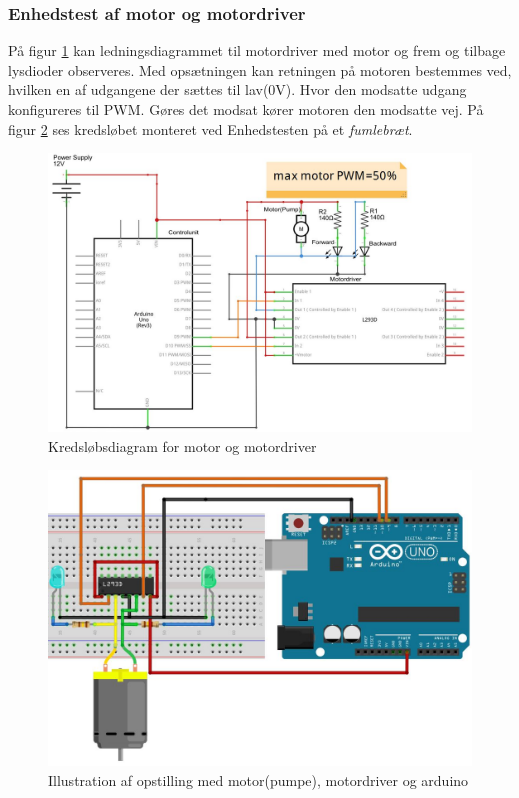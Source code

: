 \subsubsection{Enhedstest af motor og motordriver}
 På figur \ref{fig:motordriverdiagram} kan ledningsdiagrammet til motordriver med motor og frem og tilbage lysdioder observeres. Med opsætningen kan retningen på motoren bestemmes ved, hvilken en af udgangene der sættes til lav(0V). Hvor den modsatte udgang konfigureres til PWM. Gøres det modsat kører motoren den modsatte vej. På figur \ref{fig:Motorbreadboard} ses kredsløbet monteret ved Enhedstesten på et \textit{fumlebræt}.
 
 \begin{figure}[H]
	\centering
	\includegraphics[width=1\textwidth]{billeder/Hardware/diagrammer/motordiagram.JPG}
	\caption{Kredsløbsdiagram for motor og motordriver}
	\label{fig:motordriverdiagram}
\end{figure}

 \begin{figure}[H]
	\centering
	\includegraphics[width=1\textwidth]{billeder/Hardware/diagrammer/Motorbreadboard.JPG}
	\caption{Illustration af opstilling med motor(pumpe), motordriver og arduino}
	\label{fig:Motorbreadboard}
\end{figure}


